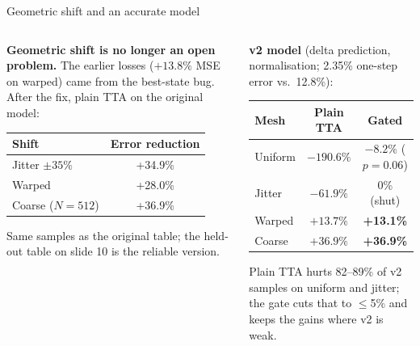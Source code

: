 \documentclass[aspectratio=169,11pt]{beamer}
\newcommand{\up}[1]{\textcolor{good}{#1}}
\newcommand{\dn}[1]{\textcolor{bad}{#1}}
\begin{document}
\begin{frame}{Geometric shift and an accurate model}
\begin{columns}[T]
\begin{column}{0.47\textwidth}
\small
\textbf{Geometric shift is no longer an open problem.} The earlier losses ($+13.8\%$ MSE on warped) came from the best-state bug. After the fix, plain TTA on the original model:
\vspace{3pt}
\begin{center}
\begin{tabular}{lc}
\toprule
Shift & Error reduction \\
\midrule
Jitter $\pm35\%$ & \up{+34.9\%} \\
Warped & \up{+28.0\%} \\
Coarse ($N{=}512$) & \up{+36.9\%} \\
\bottomrule
\end{tabular}
\end{center}
{\footnotesize\color{muted} Same samples as the original table; the held-out table on slide 10 is the reliable version.}
\end{column}
\begin{column}{0.49\textwidth}
\small
\textbf{v2 model} (delta prediction, normalisation; 2.35\% one-step error vs.\ 12.8\%):
\vspace{3pt}
\begin{center}\footnotesize
\begin{tabular}{lcc}
\toprule
Mesh & Plain TTA & \textbf{Gated} \\
\midrule
Uniform & \dn{$-190.6\%$} & $-8.2\%$ {\scriptsize($p{=}0.06$)} \\
Jitter & \dn{$-61.9\%$} & 0\% {\scriptsize(shut)} \\
Warped & \up{$+13.7\%$} & \textbf{\up{+13.1\%}} \\
Coarse & \up{$+36.9\%$} & \textbf{\up{+36.9\%}} \\
\bottomrule
\end{tabular}
\end{center}
\begin{finding}
Plain TTA hurts 82--89\% of v2 samples on uniform and jitter; the gate cuts that to $\le$5\% and keeps the gains where v2 is weak.
\end{finding}
\end{column}
\end{columns}
\end{frame}
\end{document}

